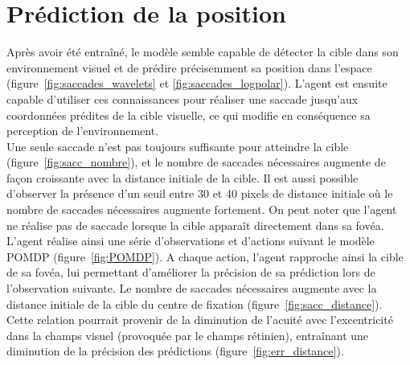 
\section{Prédiction de la position}

Après avoir été entraîné, le modèle semble capable de détecter la cible dans son environnement visuel et de prédire précisemment sa position dans l'espace (figure~\ref{fig:saccades_wavelets} et \ref{fig:saccades_logpolar}). L'agent est ensuite capable d'utiliser ces connaissances pour réaliser une saccade jusqu'aux coordonnées prédites de la cible visuelle, ce qui modifie en conséquence sa perception de l'environnement.\\
Une seule saccade n'est pas toujours suffisante pour atteindre la cible (figure~\ref{fig:sacc_nombre}), et le nombre de saccades nécessaires augmente de façon croissante avec la distance initiale de la cible. Il est aussi possible d'observer la présence d'un seuil entre 30 et 40 pixels de distance initiale où le nombre de saccades nécessaires augmente fortement. On peut noter que l'agent ne réalise pas de saccade lorsque la cible apparaît directement dans sa fovéa.\\
L'agent réalise ainsi une série d'observations et d'actions suivant le modèle POMDP (figure~\ref{fig:POMDP}). A chaque action, l'agent rapproche ainsi la cible de sa fovéa, lui permettant d'améliorer la précision de sa prédiction lors de l'observation suivante. 
Le nombre de saccades nécessaires augmente avec la distance initiale de la cible du centre de fixation (figure~\ref{fig:sacc_distance}). \\
Cette relation pourrait provenir de la diminution de l'acuité avec l'excentricité dans la champs visuel (provoquée par le champs rétinien), entraînant une diminution de la précision des prédictions (figure~\ref{fig:err_distance}).\\



